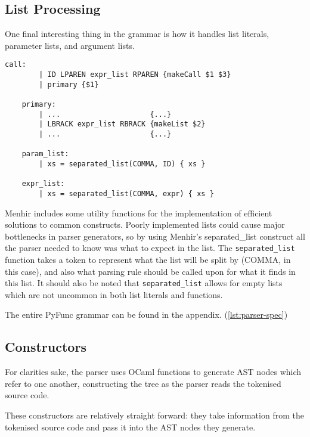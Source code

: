 \documentclass{l4proj}
\begin{document}
\subsection*{List Processing}
    
    One final interesting thing in the grammar is how it handles list literals, parameter lists, and argument lists.
    \begin{lstlisting}[caption=PyFunc's Parser grammar for handling list literals.]
    call:
        | ID LPAREN expr_list RPAREN {makeCall $1 $3}
        | primary {$1}
    
    primary:
        | ...                     {...}
        | LBRACK expr_list RBRACK {makeList $2}
        | ...                     {...}

    param_list:
        | xs = separated_list(COMMA, ID) { xs }

    expr_list:
        | xs = separated_list(COMMA, expr) { xs }
    \end{lstlisting}

    Menhir includes some utility functions for the implementation of efficient solutions to common constructs.
    Poorly implemented lists could cause major bottlenecks in parser generators, so by using Menhir's separated\_list construct all the parser needed to know was what to expect in the list.
    The \texttt{separated\_list} function takes a token to represent what the list will be split by (COMMA, in this case), and also what parsing rule should be called upon for what it finds in this list.
    It should also be noted that \texttt{separated\_list} allows for empty lists which are not uncommon in both list literals and functions.


The entire PyFunc grammar can be found in the appendix. (\ref{lst:parser-spec})
\subsection{Constructors}

For clarities sake, the parser uses OCaml functions to generate AST nodes which refer to one another, constructing the tree as the parser reads the tokenised source code.

These constructors are relatively straight forward: they take information from the tokenised source code and pass it into the AST nodes they generate.
\end{document}
